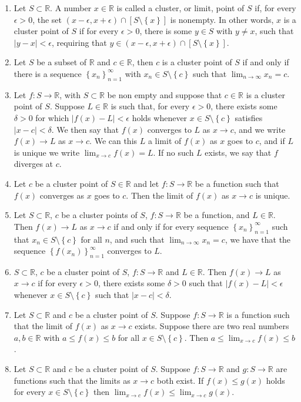 \documentclass[12pt]{article}
\newcommand{\set}[1]{\left\{ {#1} \right\}}
\newcommand{\limit}[1]{\displaystyle \lim_{ {#1} }}
\newcommand{\limtoinf}[1][n]{\displaystyle\lim_{ {#1} \to \infty}}
\newcommand{\abs}[1]{\left| {#1} \right|}
\newcommand{\seq}[2][n]{\left\{ {#2} \right\}_{#1=1}^\infty}
\newcommand{\paren}[1]{\left( {#1} \right)}
\newcommand{\bR}{\mathbb{R}}
\begin{document}
\begin{enumerate}
	\item Let $S\subset\bR$. A number $x\in\bR$ is called a cluster, or limit, point of $S$ if, for every $\epsilon>0$, the set $\paren{x-\epsilon, x+\epsilon}\cap [ S\setminus \set{x}]$ is nonempty. In other words, $x$ is a cluster point of $S$ if for every $\epsilon>0$, there is some $y\in S$ with $y\neq x$, such that $\abs{y-x}<\epsilon$, requiring that $y\in\paren{x-\epsilon, x+\epsilon}\cap [S\setminus\set{x}]$.
	\item Let $S$ be a subset of $\bR$ and $c\in\bR$, then $c$ is a cluster point of $S$ if and only if there is a sequence $\seq{x_n}$ with $x_n\in S\setminus \set{c}$ such that $\limtoinf x_n=c$.
	\item Let $f:S\to\bR$, with $S\subset\bR$ be non empty and suppose that $c\in\bR$ is a cluster point of $S$. Suppose $L\in\bR$ is such that, for every $\epsilon>0$, there exists some $\delta>0$ for which $\abs{f(x)-L}<\epsilon$ holds whenever $x\in S\setminus\set{c}$ satisfies $\abs{x-c}<\delta$. We then say that $f(x)$ converges to $L$ as $x\to c$, and we write $f(x)\to L$ as $x\to c$. We can this $L$ a limit of $f(x)$ as $x$ goes to $c$, and if $L$ is unique we write $\limit{x\to c}f(x)=L$. If no such $L$ exists, we say that $f$ diverges at $c$.
	\item Let $c$ be a cluster point of $S\in\bR$ and let $f:S\to\bR$ be a function such that $f(x)$ converges as $x$ goes to $c$. Then the limit of $f(x)$ as $x\to c$ is unique.
	\item Let $S\subset\bR$, $c$ be a cluster points of $S$, $f:S\to\bR$ be a function, and $L\in\bR$. Then $f(x)\to L$ as $x\to c$ if and only if for every sequence $\seq{x_n}$ such that $x_n\in S\setminus\set{c}$ for all $n$, and such that $\limtoinf x_n =c$, we have that the sequence $\seq{f(x_n)}$ converges to $L$.
	\item $S\subset\bR$, $c$ be a cluster point of $S$, $f:S\to\bR$ and $L\in\bR$. Then $f(x)\to L$ as $x\to c$ if for every $\epsilon>0$, there exists some $\delta>0$ such that $\abs{f(x)-L}<\epsilon$ whenever $x\in S\setminus\set{c}$ such that $\abs{x-c}<\delta$.
	\item Let $S\subset\bR$ and $c$ be a cluster point of $S$. Suppose $f:S\to\bR$ is a function such that the limit of $f(x)$ as $x\to c$ exists. Suppose there are two real numbers $a,b\in\bR$ with $a\le f(x)\le b$ for all $x\in S\setminus\set{c}$. Then $a\le\limit{x\to c} f(x)\le b$.
	\item Let $S\subset\bR$ and $c$ be a cluster point of $S$. Suppose $f:S\to\bR$ and $g:S\to\bR$ are functions such that the limits as $x\to c$ both exist. If $f(x)\le g(x)$ holds for every $x\in S\setminus\set{c}$ then $\limit{x\to c} f(x)\le \limit{x\to c} g(x)$.

\end{enumerate}
\end{document}
